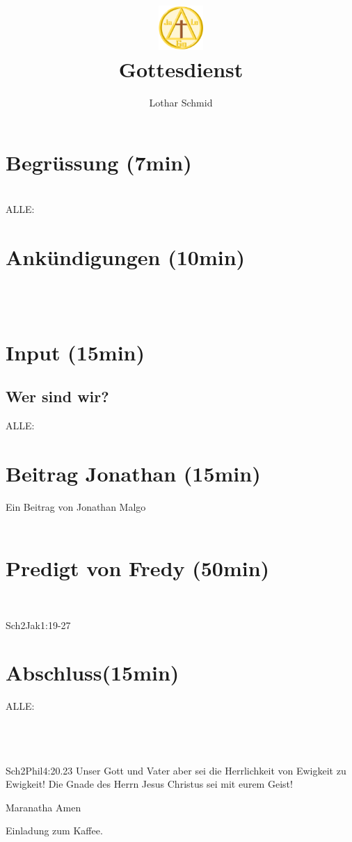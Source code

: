 \documentclass[12pt,a4paper]{scrarticle}
\title{\includegraphics[height=48pt]{assets/images/logo.png}\\Gottesdienst}
\author{Lothar Schmid}
\begin{document}
\maketitle
\section{Begrüssung (7min)}
\beten{} \\
ALLE: 

\section{Ankündigungen (10min)}
\\
\\

\section{ Input (15min)}
\subsection{Wer sind wir?}

ALLE: 

\section{Beitrag Jonathan (15min)}
Ein Beitrag von Jonathan Malgo\\
\\

\section{Predigt von Fredy (50min)}
\\
\begin{bibeltext}{Sch2}{Jak}{1:19-27}
\end{bibeltext}

\section{Abschluss(15min)}
ALLE: \\
\beten{} \\
\\
\\
\begin{bibeltext}{Sch2}{Phil}{4:20.23}
Unser Gott und Vater aber sei die Herrlichkeit von Ewigkeit zu Ewigkeit!
Die Gnade des Herrn Jesus Christus sei mit eurem Geist!
\end{bibeltext}
Maranatha Amen

Einladung zum Kaffee.
\end{document}
